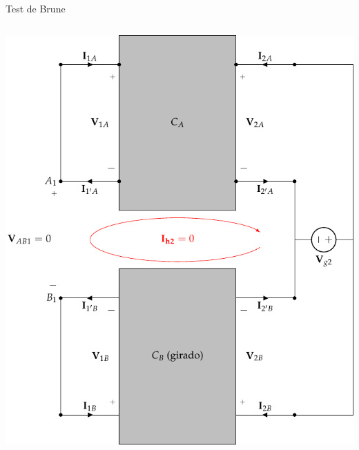 \documentclass[xcolor={usenames,svgnames,dvipsnames}]{beamer}
\begin{document}
\begin{frame}[label={sec:org5d7984d},plain]{Test de Brune}
\begin{columns}
\begin{column}{0.65\columnwidth}
\begin{center}
\includegraphics[width=.9\linewidth]{../figs/paralelo-paralelo-brune-salida.pdf}
\end{center}
\end{column}
\end{columns}
\end{frame}
\end{document}
